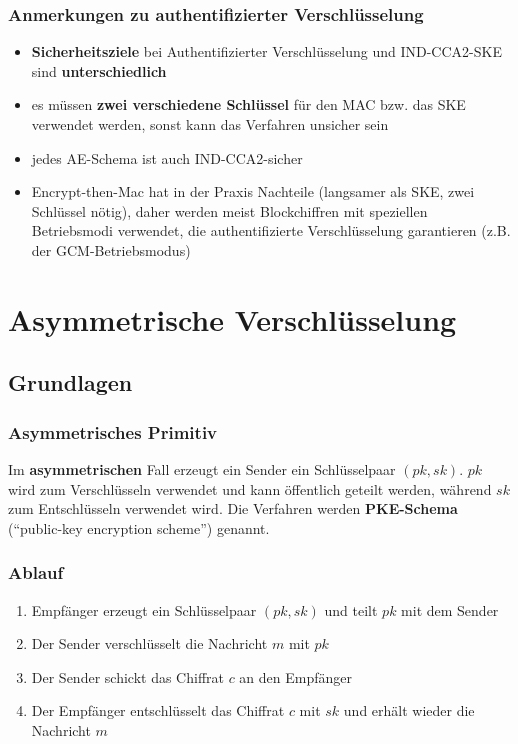 \documentclass[12pt,A4]{extarticle}
\newcommand{\highlight}[1]{\textcolor{highlightColor}{\textbf{#1}}}
\begin{document}
\subsubsection{Anmerkungen zu authentifizierter Verschlüsselung}
\begin{itemize}
  \item{\textbf{Sicherheitsziele} bei Authentifizierter Verschlüsselung und IND-CCA2-SKE sind \textbf{unterschiedlich}}
  \item{es müssen \textbf{zwei verschiedene Schlüssel} für den MAC bzw. das SKE verwendet werden, sonst kann das Verfahren unsicher sein}
  \item{jedes AE-Schema ist auch IND-CCA2-sicher}
  \item{Encrypt-then-Mac hat in der Praxis Nachteile (langsamer als SKE, zwei Schlüssel nötig), daher werden meist Blockchiffren mit speziellen Betriebsmodi verwendet, die authentifizierte Verschlüsselung garantieren (z.B. der GCM-Betriebsmodus)}
\end{itemize}

\section{Asymmetrische Verschlüsselung}
\subsection{Grundlagen}
\subsubsection{Asymmetrisches Primitiv}
Im \textbf{asymmetrischen} Fall erzeugt ein Sender ein Schlüsselpaar $(pk, sk)$. $pk$ wird zum Verschlüsseln verwendet und kann öffentlich geteilt werden, während $sk$ zum Entschlüsseln verwendet wird. Die Verfahren werden \highlight{PKE-Schema} (``public-key encryption scheme'') genannt.

\subsubsection{Ablauf}
\begin{enumerate}
  \item{Empfänger erzeugt ein Schlüsselpaar $(pk, sk)$ und teilt $pk$ mit dem Sender}
  \item{Der Sender verschlüsselt die Nachricht $m$ mit $pk$}
  \item{Der Sender schickt das Chiffrat $c$ an den Empfänger}
  \item{Der Empfänger entschlüsselt das Chiffrat $c$ mit $sk$ und erhält wieder die Nachricht $m$}
\end{enumerate}
\end{document}

